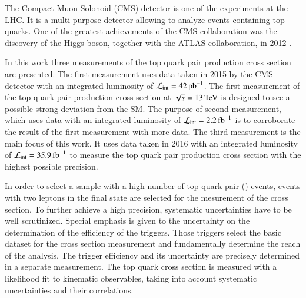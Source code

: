 The Compact Muon Solonoid (CMS) detector is one of the experiments at the LHC. It is a multi purpose detector allowing to analyze events containing top quarks.
One of the greatest achievements of the CMS collaboration was the discovery of the Higgs boson, together with the ATLAS collaboration, in 2012 \cite{201230,20121}.   

In this work three measurements of the top quark pair production cross section are presented.
The first measurement uses data taken in 2015 by the CMS detector with an integrated luminosity of $\mathcal{L}_{\mathrm{int}}= 42 \mbox{\ensuremath{\,\text{pb}^\text{$-$1}}}$. The first measurement of the top quark pair production
cross section at $\sqrt{s}=13 \,\text{Te\hspace{-.08em}V}$ is designed to see a possible strong deviation from the SM. The purpose of second measurement, which uses data with an integrated luminosity of $\mathcal{L}_{\mathrm{int}}= 2.2 \mbox{\ensuremath{\,\text{fb}^\text{$-$1}}}$ is to corroborate the result of the first measurement with more data.
The third measurement is the main focus of this work. It uses data taken in 2016 with an integrated luminosity of $\mathcal{L}_{\mathrm{int}}= 35.9 \mbox{\ensuremath{\,\text{fb}^\text{$-$1}}}$ to measure the top quark pair production cross section with the highest possible precision.

In order to select a sample with a high number of top quark pair (\ttbar) events, events with two leptons in the final state are selected for the mesurement of the cross section.
To further achieve a high precision, systematic uncertainties have to be well scrutinized.
Special emphasis is given to the uncertainty on the determination of the efficiency of the triggers. Those triggers select the basic dataset for the cross section measurement and fundamentally determine the reach of the analysis. The trigger efficiency and its uncertainty are precisely determined in a separate measurement.
The top quark cross section is measured with a likelihood fit to kinematic observables, taking into account systematic uncertainties and their correlations. 

